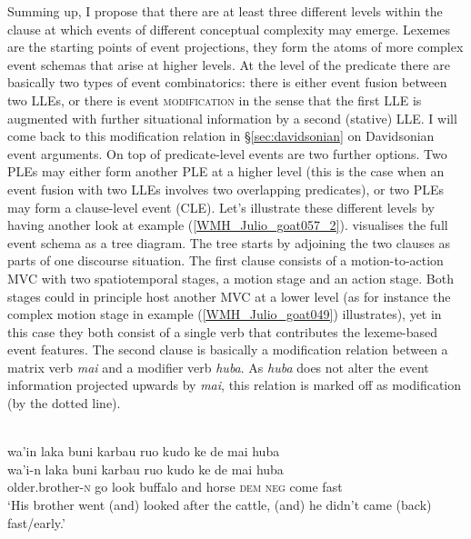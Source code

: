 Summing up, I propose that there are at least three different levels within the clause at which events of different conceptual complexity may emerge. Lexemes are the starting points of event projections, they form the atoms of more complex event schemas that arise at higher levels. At the level of the predicate there are basically two types of event combinatorics: there is either event fusion between two LLEs, or there is event \textsc{modification} in the sense that the first LLE is augmented with further situational information by a second (stative) LLE. I will come back to this modification relation in §\ref{sec:davidsonian} on Davidsonian event arguments. On top of predicate-level events are two further options. Two PLEs may either form another PLE at a higher level (this is the case when an event fusion with two LLEs involves two overlapping predicates), or two PLEs may form a clause-level event (CLE). Let's illustrate these different levels by having another look at example (\ref{WMH_Julio_goat057_2}).  visualises the full event schema as a tree diagram. The tree starts by adjoining the two clauses as parts of one discourse situation. The first clause consists of a motion-to-action MVC with two spatiotemporal stages, a motion stage and an action stage. Both stages could in principle host another MVC at a lower level (as for instance the complex motion stage in example (\ref{WMH_Julio_goat049}) illustrates), yet in this case they both consist of a single verb that contributes the lexeme-based event features. The second clause is basically a modification relation between a matrix verb \textit{mai} and a modifier verb \textit{huba}. As \textit{huba} does not alter the event information projected upwards by \textit{mai}, this relation is marked off as modification (by the dotted line).

\ea \label{WMH_Julio_goat057_2}
\\
\glll wa'in laka buni karbau ruo kudo ke de mai huba \\
wa'i-n laka buni karbau ruo kudo ke de mai huba \\
older.brother-\textsc{n} go look buffalo and horse \textsc{dem} \textsc{neg} come fast\\
\glft `His brother went (and) looked after the cattle, (and) he didn't came (back) fast/early.'\\ 
\z

